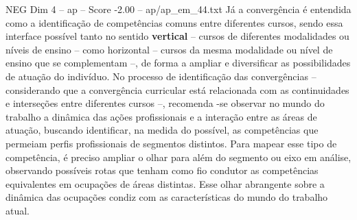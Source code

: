 \begin{textsample}{NEG Dim 4 – ap – Score -2.00 – ap/ap\_em\_44.txt}
Já a convergência é entendida como a identificação de competências comuns entre diferentes cursos, sendo essa interface possível tanto no sentido \textbf{vertical} – cursos de diferentes modalidades ou níveis de ensino – como horizontal – cursos da mesma modalidade ou nível de ensino que se complementam –, de forma a ampliar e diversificar as possibilidades de atuação do indivíduo.
No processo de identificação das convergências – considerando que a convergência curricular está relacionada com as continuidades e interseções entre diferentes cursos –, recomenda -se observar no mundo do trabalho a dinâmica das ações profissionais e a interação entre as áreas de atuação, buscando identificar, na medida do possível, as competências que permeiam perfis profissionais de segmentos distintos.
Para mapear esse tipo de competência, é preciso ampliar o olhar para além do segmento ou eixo em análise, observando possíveis rotas que tenham como fio condutor as competências equivalentes em ocupações de áreas distintas.
Esse olhar abrangente sobre a dinâmica das ocupações condiz com as características do mundo do trabalho atual.

\end{textsample}
